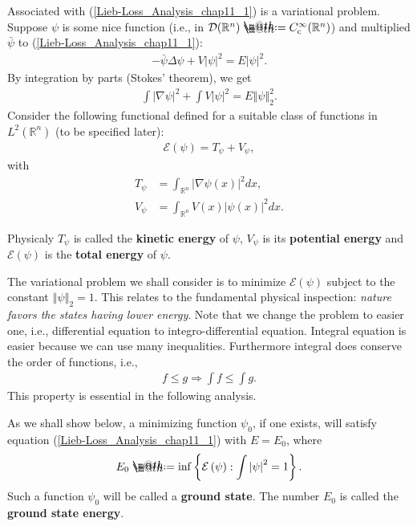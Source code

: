 \documentclass[openany, a4paper, oneside]{book}
\makeatletter
\newcommand*{\defeq}{\mathrel{\rlap{%
\raisebox{0.3ex}{$\m@th\cdot$}}%
\raisebox{-0.3ex}{$\m@th\cdot$}}%
=}
\theoremstyle{break}
\theoremstyle{breakdefn}
\newcommand{\abs}[1]{\left|#1\right|}
\newcommand{\norm}[1]{\left\Vert#1\right\Vert}
\newcommand{\twonorm}[1]{\norm{#1}_2}
\newcommand{\rbk}[1]{\left (#1\right)}
\newcommand{\set}[2]{\left\{#1 : #2\right\}}
\newcommand{\bbR}{\mathbb{R}}
\newcommand{\bbRn}{\mathbb{R}^n}
\newcommand{\calD}{\mathcal{D}}
\newcommand{\calE}{\mathcal{E}}
\newcommand{\Ccinfty}{C_{\mathrm{c}}^{\infty}}
\newcommand{\LtwoRn}{L^2 \rbk{\bbR^n}}
\makeatother
\begin{document}
Associated with (\ref{Lieb-Loss_Analysis_chap11_1}) is a variational problem.
Suppose $\psi$ is some nice function (i.e., in $\calD (\bbRn) \defeq \Ccinfty (\bbRn)$) and multiplied $\bar{\psi}$ to (\ref{Lieb-Loss_Analysis_chap11_1}):
\begin{align}
 -\bar{\psi} \Delta \psi + V \abs{\psi}^2 = E \abs{\psi}^2.
\end{align}
By integration by parts (Stokes' theorem), we get
\begin{align}
 \int \abs{\nabla \psi}^2 + \int V \abs{\psi}^2 = E \twonorm{\psi}^2.
\end{align}
Consider the following functional defined for a suitable class of functions in $\LtwoRn$ (to be specified later):
\begin{align}
 \calE \rbk{\psi}
 =
 T_{\psi} + V_{\psi}, \label{Lieb-Loss_Analysis_chap11_3}
\end{align}
with
\begin{align}
 T_{\psi}
 &=
 \int_{\bbR^n} \abs{\nabla \psi (x)}^2 dx, \\
 V_{\psi}
 &=
 \int_{\bbR^n} V (x) \abs{\psi (x)}^2 dx.
\end{align}

Physicaly $T_{\psi}$ is called the \textbf{kinetic energy} of $\psi$, $V_{\psi}$ is its \textbf{potential energy}
and $\calE (\psi)$ is the \textbf{total energy} of $\psi$.

The variational problem we shall consider is to minimize $\calE (\psi)$ subject to the constant $\twonorm{\psi} = 1$.
This relates to the fundamental physical inspection: \textit{nature favors the states having lower energy}.
Note that we change the problem to easier one, i.e., differential equation to integro-differential equation.
Integral equation is easier because we can use many inequalities.
Furthermore integral does conserve the order of functions, i.e.,
\begin{align}
 f \leq g
 \Longrightarrow
 \int f \leq \int g.
\end{align}
This property is essential in the following analysis.

As we shall show below, a minimizing function $\psi_0$, if one exists, will satisfy equation (\ref{Lieb-Loss_Analysis_chap11_1})
with $E = E_0$, where
\begin{align}
 E_0
 \defeq
 \inf \set{\calE \rbk{\psi}} {\int \abs{\psi}^2 = 1}.
\end{align}
Such a function $\psi_0$ will be called a \textbf{ground state}.
The number $E_0$ is called the \textbf{ground state energy}.
\end{document}
